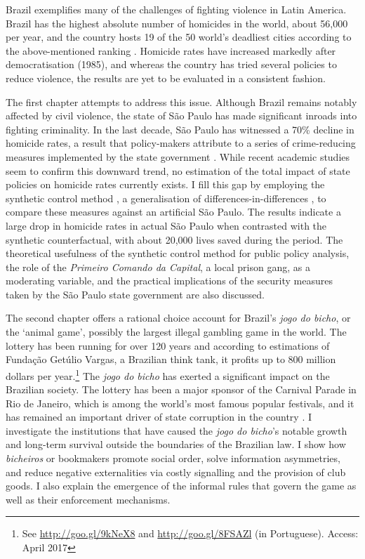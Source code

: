 Brazil exemplifies many of the challenges of fighting violence in Latin America. Brazil has the highest absolute number of homicides in the world, about 56,000 per year, and the country hosts 19 of the 50 world's deadliest cities according to the above-mentioned ranking \citep{mapa2014, mexico2014,unodc2013}. Homicide rates have increased markedly after democratisation (1985), and whereas the country has tried several policies to reduce violence, the results are yet to be evaluated in a consistent fashion. 

The first chapter attempts to address this issue. Although Brazil remains notably affected by civil violence, the state of São Paulo has made significant inroads into fighting criminality. In the last decade, São Paulo has witnessed a 70\% decline in homicide rates, a result that policy-makers attribute to a series of crime-reducing measures implemented by the state government \citep{goertzel2009,kahn2005papel}. While recent academic studies seem to confirm this downward trend, no estimation of the total impact of state policies on homicide rates currently exists. I fill this gap by employing the synthetic control method \citep{abadie2003,abadie2010,abadie2014}, a generalisation of differences-in-differences \citep{angrist2008mostly,bertrand2004much,imbens2009recent}, to compare these measures against an artificial São Paulo. The results indicate a large drop in homicide rates in actual São Paulo when contrasted with the synthetic counterfactual, with about 20,000 lives saved during the period. The theoretical usefulness of the synthetic control method for public policy analysis, the role of the \textit{Primeiro Comando da Capital}, a local prison gang, as a moderating variable, and the practical implications of the security measures taken by the São Paulo state government are also discussed.

The second chapter offers a rational choice account for Brazil's \textit{jogo do bicho}, or the `animal game', possibly the largest illegal gambling game in the world. The lottery has been running for over 120 years and according to estimations of Fundação Getúlio Vargas, a Brazilian think tank, it profits up to 800 million dollars per year.\footnote{See \url{http://goo.gl/9kNeX8} and \url{http://goo.gl/8FSAZl} (in Portuguese). Access: April 2017} The \emph{jogo do bicho} has exerted a significant impact on the Brazilian society. The lottery has been a major sponsor of the Carnival Parade in Rio de Janeiro, which is among the world's most famous popular festivals, and it has remained an important driver of state corruption in the country \citep{bezerra2009mecenato,chazkel2011laws,da1999aguias,labronici2012paratodos,magalhaes2005ganhou,soares1993jogo}. I investigate the institutions that have caused the \emph{jogo do bicho}'s notable growth and long-term survival outside the boundaries of the Brazilian law. I show how \textit{bicheiros} or bookmakers promote social order, solve information asymmetries, and reduce negative externalities via costly signalling and the provision of club goods. I also explain the emergence of the informal rules that govern the game as well as their enforcement mechanisms.

